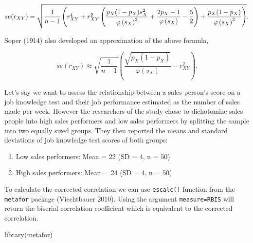 \documentclass[
  letterpaper,
  DIV=11,
  numbers=noendperiod]{scrreprt}
\newenvironment{Shaded}{}{}
\newcommand{\FunctionTok}[1]{\textcolor[rgb]{0.39,0.29,0.61}{#1}}
\newcommand{\NormalTok}[1]{\textcolor[rgb]{0.12,0.11,0.11}{#1}}
\providecommand{\tightlist}{%
  \setlength{\itemsep}{0pt}\setlength{\parskip}{0pt}}\usepackage{longtable,booktabs,array}
\begin{document}
\[
\small{se(r_{XY}) = \sqrt{\frac{1}{n-1} \left(r_{XY}^4+r_{XY}^2\left(\frac{p_X(1-p_X)s_X^2}{\varphi\left(s_X\right)^2} + \frac{2p_X - 1}{\varphi\left(s_X\right)} -\frac{5}{2}\right)+\frac{p_X(1-p_X)}{\varphi\left(s_X\right)^2}\right)}}.
\]

Soper (1914) also developed an approximation of the above formula,

\[
se(r_{XY}) \approx \sqrt{\frac{1}{n-1}} \left(\frac{\sqrt{p_X(1-p_X)}}{\varphi\left(s_X\right)}-r_{XY}^2\right).
\]

\begin{tcolorbox}[enhanced jigsaw, toptitle=1mm, titlerule=0mm, arc=.35mm, breakable, colframe=quarto-callout-note-color-frame, title={Applied Example in R}, opacitybacktitle=0.6, opacityback=0, colbacktitle=quarto-callout-note-color!10!white, coltitle=black, bottomtitle=1mm, colback=white, bottomrule=.15mm, rightrule=.15mm, toprule=.15mm, leftrule=.75mm, left=2mm]

Let's say we want to assess the relationship between a sales person's
score on a job knowledge test and their job performance estimated as the
number of sales made per week. However the researchers of the study
chose to dichotomize sales people into high sales performers and low
sales performers by splitting the sample into two equally sized groups.
They then reported the means and standard deviations of job knowledge
test scores of both groups:

\begin{enumerate}
\def\labelenumi{\arabic{enumi}.}
\tightlist
\item
  Low sales performers: Mean = 22 (SD = 4, n = 50)
\item
  High sales performers: Mean = 24 (SD = 4, n = 50)
\end{enumerate}

To calculate the corrected correlation we can use \texttt{escalc()}
function from the \texttt{metafor} package (Viechtbauer 2010). Using the
argument \texttt{measure=\textquotesingle{}RBIS\textquotesingle{}} will
return the biserial correlation coefficient which is equivalent to the
corrected correlation.

\begin{Shaded}
\begin{Highlighting}[]
\FunctionTok{library}\NormalTok{(metafor)}


\end{Highlighting}
\end{Shaded}
\end{tcolorbox}
\end{document}
